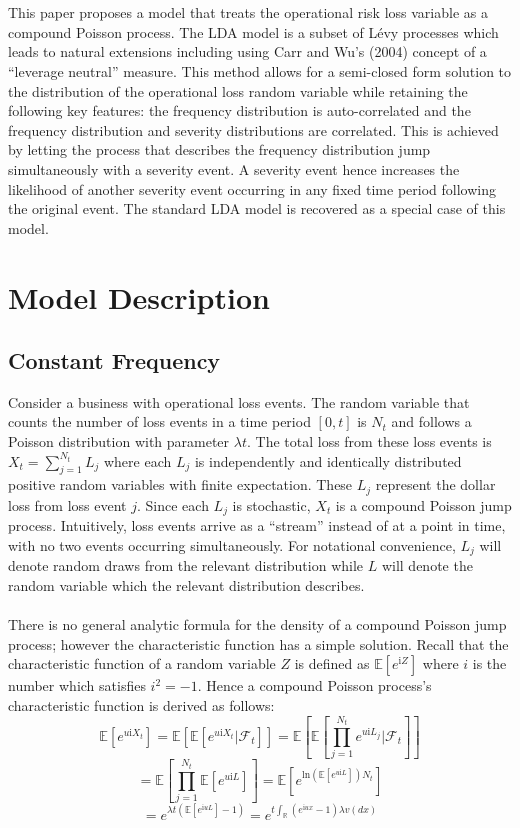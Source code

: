 \documentclass{article}
\theoremstyle{definition}
\begin{document}
\\
\\
This paper proposes a model that treats the operational risk loss variable as a compound Poisson process. The LDA model is a subset of L\'evy processes which leads to natural extensions including using Carr and Wu's (2004) concept of a ``leverage neutral'' measure.  This method allows for a semi-closed form solution to the distribution of the operational loss random variable while retaining the following key features: the frequency distribution is auto-correlated and the frequency distribution and severity distributions are correlated.  This is achieved by letting the process that describes the frequency distribution jump simultaneously with a severity event.  A severity event hence increases the likelihood of another severity event occurring in any fixed time period following the original event. The standard LDA model is recovered as a special case of this model.

\section{Model Description}
\subsection{Constant Frequency}
Consider a business with operational loss events.  The random variable that counts the number of loss events in a time period \([0, t]\) is \(N_t\) and follows a Poisson distribution with parameter \(\lambda t\).  The total loss from these loss events is \(X_t=\sum_{j=1} ^ {N_t} L_j\) where each \(L_j\) is independently and identically distributed positive random variables with finite expectation.  These \(L_j\) represent the dollar loss from loss event \(j\).  Since each \(L_j\) is stochastic, \(X_t\) is a compound Poisson jump process.  Intuitively, loss events arrive as a ``stream'' instead of at a point in time, with no two events occurring simultaneously.  For notational convenience, \(L_j\) will denote random draws from the relevant distribution while \(L\) will denote the random variable which the relevant distribution describes.  
\\
\\
There is no general analytic formula for the density of a compound Poisson jump process; however the characteristic function has a simple solution.  Recall that the characteristic function of a random variable \(Z\) is defined as \(\mathbb{E}[e^{\mathrm{i}Z}]\) where \(i\) is the number which satisfies \(i^2=-1\).  Hence a compound Poisson process's characteristic function is derived as follows: 
\[\mathbb{E}[e^{u\mathrm{i}X_t}]=\mathbb{E}\left[\mathbb{E}[e^{u\mathrm{i}X_t}|\mathcal{F}_t]\right]=\mathbb{E}\left[\mathbb{E}\left[\prod_{j=1} ^ {N_t} e^{u\mathrm{i} L_j}|\mathcal{F}_t\right]\right]\]
\[=\mathbb{E}\left[\prod_{j=1} ^ {N_t} \mathbb{E}[e^{u\mathrm{i}L}] \right]=\mathbb{E}\left[e^{\mathrm{ln}\left(\mathbb{E}[e^{u\mathrm{i}L}]\right) N_t}\right]\]
\[=e^{\lambda t \left(\mathbb{E}\left[ e^{\mathrm{i}uL}\right]-1\right)}=e^{t \int_{\mathbb{R}} (e^{\mathrm{i}ux}-1) \lambda v(dx)}\]
\end{document}
